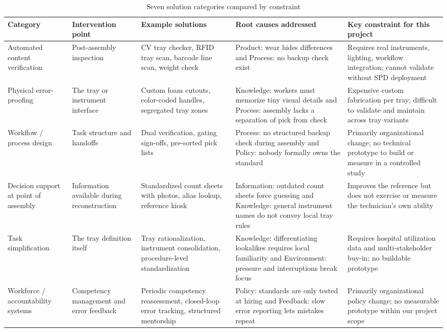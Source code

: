 \documentclass[10pt,a4paper]{article}
\begin{document}
\begin{table}[H]
\centering
\caption{Seven solution categories compared by constraint}
\label{tab:seven-solution-categories-compared-by-constraint}
\small\renewcommand{\arraystretch}{1.2}\setlength{\tabcolsep}{4pt}
\begin{tabularx}{\textwidth}{|>{\raggedright\arraybackslash}p{2.2cm}|>{\raggedright\arraybackslash}p{1.8cm}|>{\raggedright\arraybackslash}X|>{\raggedright\arraybackslash}p{3cm}|>{\raggedright\arraybackslash}X|}
\hline
Category & Intervention point & Example solutions & Root causes addressed & Key constraint for this project \\
\hline
Automated content verification & Post-assembly inspection & CV tray checker, RFID tray scan, barcode line scan, weight check & Product: wear hides differences and Process: no backup check exist & Requires real instruments, lighting, workflow integration; cannot validate without SPD deployment \\
\hline
Physical error-proofing & The tray or instrument interface & Custom foam cutouts, color-coded handles, segregated tray zones & Knowledge: workers must memorize tiny visual details and Process: assembly lacks a separation of pick from check & Expensive custom fabrication per tray; difficult to validate and maintain across tray variants \\
\hline
Workflow / process design & Task structure and handoffs & Dual verification, gating sign-offs, pre-sorted pick lists & Process: no structured backup check during assembly and Policy: nobody formally owns the standard & Primarily organizational change; no technical prototype to build or measure in a controlled study \\
\hline
Decision support at point of assembly & Information available during reconstruction & Standardized count sheets with photos, alias lookup, reference kiosk & Information: outdated count sheets force guessing and Knowledge: general instrument names do not convey local tray rules & Improves the reference but does not exercise or measure the technician's own ability \\
\hline
Task simplification & The tray definition itself & Tray rationalization, instrument consolidation, procedure-level standardization & Knowledge: differentiating lookalikes requires local familiarity and Environment: pressure and interruptions break focus & Requires hospital utilization data and multi-stakeholder buy-in; no buildable prototype \\
\hline
Workforce / accountability systems & Competency management and error feedback & Periodic competency reassessment, closed-loop error tracking, structured mentorship & Policy: standards are only tested at hiring and Feedback: slow error reporting lets mistakes repeat & Primarily organizational policy change; no measurable prototype within our project scope \\

\end{tabularx}
\end{table}
\end{document}
